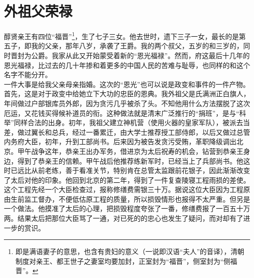 \fancyhead[RO]{} %
\fancyhead[LE]{} %
\chapter*{外祖父荣禄}
\thispagestyle{empty}
醇贤亲王有四位“福晋”\footnote{即是满语妻子的意思，也含有贵妇的意义（一说即汉语“夫人”的音译），清朝制度对亲王、都王世子之妻室均要加封，正室封为“福晋”，侧室封为“侧福晋”。}，生了七子三女。他去世时，遗下三子一女，最长的是第五子，即我的父亲，那年八岁，承袭了王爵。我的两个叔父，五岁的和三岁的，同时晋封为公爵。我家从此又开始蒙受着新的“恩光福禄”。然而，府这最后十几年的恩光福禄，比过去的几十年掺和着更多的中国人民的苦难与耻辱，也同样的和这个名字不能分开。\\

  一件大事是给我父亲母亲指婚。这次的“恩光”也可以说是政变和事件的一件产物。首先，这是对于政变中给她立下大功的忠臣的恩典。我外祖父是氏满洲正白旗人，年间做过户部银库员外郎，因为贪污几乎被杀了头。不知他用什么方法摆脱了这次厄运，又花钱买得候补道员的衔。这种做法就是清末广泛推行的“捐班”，是与“科举”同样合法的出身。初年，我祖父建立神机营（使用火器的皇家军队），被派去当差，做过翼长和总兵，经过一番累迁，由大学士推荐授工部侍郎，以后又做过总管内务府大臣，初年，升到工部尚书。后来因为被告发贪污受贿，革职降级调出北京。甲午战争这年，恭亲王出办军务，借进京为太后祝寿的机会，钻营到恭亲王身边，得到了恭亲王的信赖。甲午战后他推荐练新军时，已经当上了兵部尚书。他这时已远比从前老练，善于看准关节，特别肯在总管太监跟前花银子，因此渐渐改变了太后对他的印象。他回到北京的第二年，得到了一件复查陵寝工程雨损的差使。这个工程先经一个大臣检查过，报称修缮费需银三十万。据说这位大臣因为工程原由生前监工督办，不便低估原工程的质量，所以损毁情形也报得不太严重。但另是一个做法。他摸准了太后的心理，把损毁程度夸张了一番，修缮费报了一百五十万两。结果太后把那位大臣骂了一通，对已死的的忠心也发生了疑问，而对却有了进一步的赏识。\\

